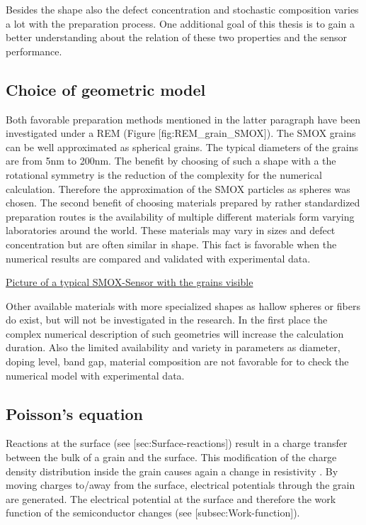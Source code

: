 \documentclass[11pt]{article}
\begin{document}
Besides the shape also the defect concentration and stochastic
composition varies a lot with the preparation process. One additional
goal of this thesis is to gain a better understanding about the relation
of these two properties and the sensor performance.

    \hypertarget{choice-of-geometric-model}{%
\subsection{Choice of geometric model}\label{choice-of-geometric-model}}

Both favorable preparation methods mentioned in the latter paragraph
have been investigated under a REM (Figure {[}fig:REM\_grain\_SMOX{]}).
The SMOX grains can be well approximated as spherical grains. The
typical diameters of the grains are from 5nm to 200nm. The benefit by
choosing of such a shape with a the rotational symmetry is the reduction
of the complexity for the numerical calculation. Therefore the
approximation of the SMOX particles as spheres was chosen. The second
benefit of choosing materials prepared by rather standardized
preparation routes is the availability of multiple different materials
form varying laboratories around the world. These materials may vary in
sizes and defect concentration but are often similar in shape. This fact
is favorable when the numerical results are compared and validated with
experimental data.

\href{WHAT!}{Picture of a typical SMOX-Sensor with the grains visible}

Other available materials with more specialized shapes as hallow spheres
or fibers do exist, but will not be investigated in the research. In the
first place the complex numerical description of such geometries will
increase the calculation duration. Also the limited availability and
variety in parameters as diameter, doping level, band gap, material
composition are not favorable for to check the numerical model with
experimental data.

    \hypertarget{poissons-equation}{%
\subsection{Poisson's equation}\label{poissons-equation}}

Reactions at the surface (see {[}sec:Surface-reactions{]}) result in a
charge transfer between the bulk of a grain and the surface. This
modification of the charge density distribution inside the grain causes
again a change in resistivity . By moving charges to/away from the
surface, electrical potentials through the grain are generated. The
electrical potential at the surface and therefore the work function of
the semiconductor changes (see {[}subsec:Work-function{]}).
\end{document}

